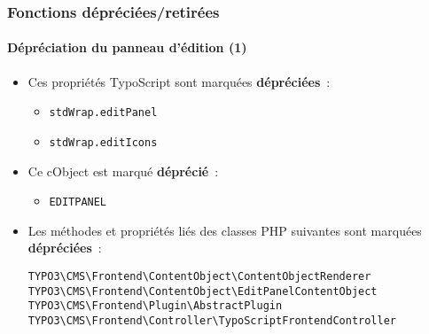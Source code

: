 %

\begin{frame}[fragile]
	\frametitle{Fonctions dépréciées/retirées}
	\framesubtitle{Dépréciation du panneau d'édition (1)}


	\begin{itemize}
		\item Ces propriétés TypoScript sont marquées \textbf{dépréciées}~:
			\begin{itemize}\small
				\item \texttt{stdWrap.editPanel}
				\item \texttt{stdWrap.editIcons}
			\end{itemize}\normalsize
		\item Ce cObject est marqué \textbf{déprécié}~:
			\begin{itemize}\small
				\item \texttt{EDITPANEL}
			\end{itemize}\normalsize
		\item Les méthodes et propriétés liés des classes PHP suivantes
			sont marquées \textbf{dépréciées}~:
\begin{lstlisting}
TYPO3\CMS\Frontend\ContentObject\ContentObjectRenderer
TYPO3\CMS\Frontend\ContentObject\EditPanelContentObject
TYPO3\CMS\Frontend\Plugin\AbstractPlugin
TYPO3\CMS\Frontend\Controller\TypoScriptFrontendController
\end{lstlisting}
	\end{itemize}

\end{frame}

